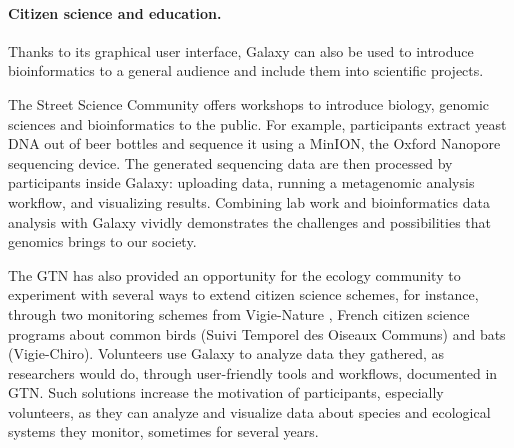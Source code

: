 \paragraph{Citizen science and education.}
Thanks to its graphical user interface, Galaxy can also be used to introduce bioinformatics to a general audience and include them into scientific projects.

The Street Science Community \cite{street-science-community} offers workshops to introduce biology, genomic sciences and bioinformatics to the public. For example, participants extract yeast DNA out of beer bottles and sequence it using a MinION, the Oxford Nanopore sequencing device. The generated sequencing data are then processed by participants inside Galaxy: uploading data, running a metagenomic analysis workflow, and visualizing results. Combining lab work and bioinformatics data analysis with Galaxy vividly demonstrates the challenges and possibilities that genomics brings to our society.

The GTN has also provided an opportunity for the ecology community to experiment with several ways to extend citizen science schemes, for instance, through two monitoring schemes from Vigie-Nature \cite{vigienature}, French citizen science programs about common birds (Suivi Temporel des Oiseaux Communs) and bats (Vigie-Chiro). Volunteers use Galaxy to analyze data they gathered, as researchers would do, through user-friendly tools and workflows, documented in GTN. Such solutions increase the motivation of participants, especially volunteers, as they can analyze and visualize data about species and ecological systems they monitor, sometimes for several years.

